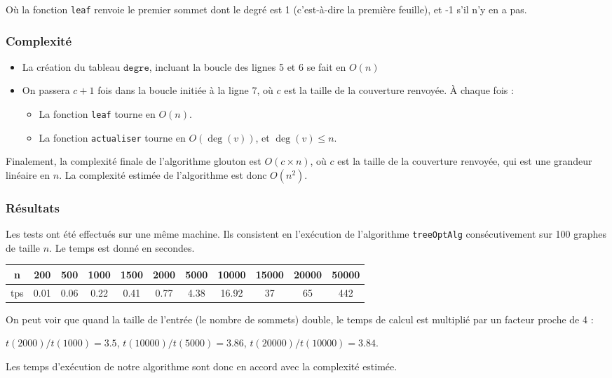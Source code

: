 \documentclass[a4paper,10pt]{article}
\newcommand*{\itemb}{\item[$\bullet$]}
\newcommand*{\itemt}{\item[$\blacktriangleright$]}
\begin{document}
Où la fonction \texttt{leaf} renvoie le premier sommet dont le degré est 1 (c'est-à-dire la première feuille), et -1 s'il n'y en a pas.

\subsubsection{Complexité}

\begin{itemize}
 \itemb La création du tableau $\mathtt{degre}$, incluant la boucle des lignes 5 et 6 se fait en $O(n)$
 \itemb On passera $c+1$ fois dans la boucle initiée à la ligne 7, où $c$ est la taille de la couverture renvoyée. À chaque fois :
\begin{itemize}
\itemt La fonction \texttt{leaf} tourne en $O(n)$.
\itemt La fonction \texttt{actualiser} tourne en $O(\deg(v))$, et $\deg (v)\leqslant n$.
\end{itemize}
\end{itemize}

Finalement, la complexité finale de l'algorithme glouton est $O(c\times n)$, où $c$ est la taille de la couverture renvoyée, qui est une grandeur linéaire en $n$. La complexité estimée de l'algorithme est donc $O(n^2)$. 

\subsubsection{Résultats}

Les tests ont été effectués sur une même machine. Ils consistent en l'exécution de l'algorithme \texttt{treeOptAlg} consécutivement sur 100 graphes de taille $n$. Le temps est donné en secondes.
\begin{center}
\begin{tabular}{|c|c|c|c|c|c|c|c|c|c|c|}
	\hline 
	n & 200 & 500 & 1000 & 1500 & 2000 & 5000 & 10000 & 15000 & 20000 & 50000 \\
	\hline
	tps & 0.01 & 0.06 & 0.22 & 0.41 & 0.77 & 4.38 & 16.92 & 37 & 65 & 442 \\
	\hline
\end{tabular}
\end{center}

On peut voir que quand la taille de l'entrée (le nombre de sommets) double, le temps de calcul est multiplié par un facteur proche de 4 :

$t(2000)/t(1000) = 3.5$, $t(10000)/t(5000) = 3.86$, $t(20000)/t(10000) = 3.84$.

Les temps d'exécution de notre algorithme sont donc en accord avec la complexité estimée.
\end{document}

